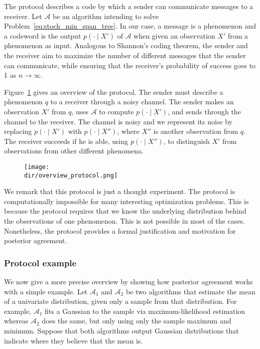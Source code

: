 The protocol describes a code by which a sender can communicate messages to a receiver. Let $\mathcal{A}$ be an algorithm intending to solve Problem~\ref{eq:stoch_min_span_tree}. In our case, a message is a phenomenon and a codeword is the output $p(\cdot \mid X')$ of $\mathcal{A}$ when given an observation $X'$ from a phenomenon as input. Analogous to Shannon's coding theorem, the sender and the receiver aim to maximize the number of different messages that the sender can communicate, while ensuring that the receiver's probability of success goes to 1 as $n \to \infty$.

Figure~\ref{fig:overview_protocol} gives an overview of the protocol. The sender must describe a phenomenon $q$ to a receiver through a noisy channel. The sender makes an observation $X'$ from $q$, uses $\mathcal{A}$ to compute $p(\cdot \mid X')$, and sends through the channel to the receiver. The channel is noisy and we represent its noise by replacing $p(\cdot \mid X')$ with $p(\cdot \mid X'')$, where $X''$ is another observation from $q$. The receiver succeeds if he is able, using $p(\cdot \mid X'')$, to distinguish $X'$ from observations from other different phenomena.

\begin{figure}
\texttt{[image: \\dir/overview\_protocol.png]}
\caption{}
\label{fig:overview_protocol}
\end{figure}

We remark that this protocol is just a thought experiment. The protocol is computationally impossible for many interesting optimization problems. This is because the protocol requires that we know the underlying distribution behind the observations of one phenomenon. This is not possible in most of the cases. Nonetheless, the protocol provides a formal justification and motivation for posterior agreement.

\subsubsection*{Protocol example}

We now give a more precise overview by showing how posterior agreement works with a simple example. Let $\mathcal{A}_1$ and $\mathcal{A}_2$ be two algorithms that estimate the mean of a univariate distribution, given only a sample from that distribution. For example, $\mathcal{A}_1$ fits a Gaussian to the sample via maximum-likelihood estimation whereas $\mathcal{A}_2$ does the same, but only using only the sample maximum and minimum. Suppose that both algorithms output Gaussian distributions that indicate where they believe that the mean is. 

